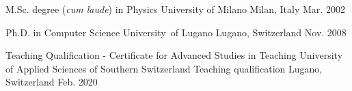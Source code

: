 \begin{cventries}
\cventry
{M.Sc. degree (\emph{cum laude}) in Physics}
{University of Milano}
{Milan, Italy}
{Mar. 2002}
{}

\cventry
{Ph.D. in Computer Science}
{University\ of Lugano}
{Lugano, Switzerland}
{Nov. 2008}
{}

\cventry
{Teaching Qualification - Certificate for Advanced Studies in Teaching}
{University of Applied Sciences of Southern Switzerland Teaching qualification}
{Lugano, Switzerland}
{Feb. 2020}
{}


\end{cventries}
